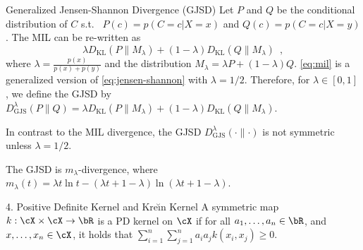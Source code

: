 \documentclass[final]{beamer}
\newcommand{\kr}{Kre\u{\i}n\xspace}
\newcommand{\kl}[2]{D_{\mathrm{KL}}( #1 \parallel #2 )}
\newcommand{\js}[2]{D_{\mathrm{JS}}( #1 \parallel #2 )}
\newcommand{\wjs}[3]{D_{\mathrm{GJS}}^{#1}( #2 \parallel #3 )}
\newlength{\onecolwid}
\begin{document}
\begin{frame}[t]
\begin{columns}[t]
\begin{column}{\onecolwid}
\begin{block}{Generalized Jensen-Shannon Divergence (GJSD)}
	 Let $P$ 
	and 
	$Q$ be the conditional distribution of $C$ s.t.\
	$ P(c) = p(C=c| X=x) $ and $ Q(c)=p(C=c| X=y) $. The MIL can be 
	re-written as
	\begin{equation}\label{eq:mil}
	\lambda \kl{P}{M_\lambda} + (1-\lambda) \kl{Q}{M_\lambda}\enspace,
	\end{equation}
	where  $\lambda=\frac{p(x)}{p(x)+p(y)}$ and the distribution $ 
	M_\lambda=\lambda P + (1-\lambda)Q $.
	\eqref{eq:mil} is a generalized version of 
	\eqref{eq:jensen-shannon} with $ \lambda=1/2 $. 
	Therefore, for $ \lambda\in [0,1] $, we define the 
	GJSD
	by
	$
	\wjs{\lambda}{P}{Q} = \lambda \kl{P}{M_\lambda} + (1-\lambda) 
	\kl{Q}{M_\lambda}$.

	
	 In 
	contrast to the MIL 
	divergence, the GJSD $ \wjs{\lambda}{\cdot}{\cdot} $ is not symmetric 
	unless 
	$ \lambda=1/2 $.

 The GJSD is  $ m_\lambda $-divergence, where $	
m_\lambda(t) = \lambda t \ln t - (\lambda t + 1 - 
\lambda)\ln(\lambda t+1-\lambda)$.
\end{block}	
\vspace{3pt}

\begin{block}{4. Positive Definite Kernel and \kr Kernel}
		 A symmetric
		  map $ 
		k:\cX\times\cX\to \bR $ is a PD kernel on $ \cX $ if for 
		all 
		  $ a_1,\dots,a_n\in \bR $, and $ 
		x,\dots,x_n\in \cX $, it holds that $
		\sum_{i=1}^n \sum_{j=1}^n a_i a_j k(x_i,x_j) \ge 0$.
	
	

\end{block}
\end{column}
\end{columns}
\end{frame}
\end{document}
